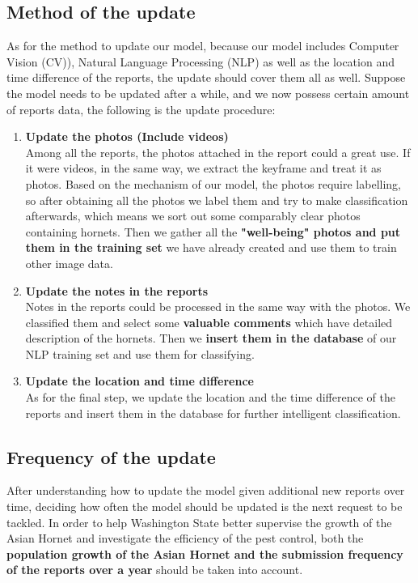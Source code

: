 \documentclass{mcmthesis}
\begin{document}
	\subsection{Method of the update}
	\quad As for the method to update our model, because our model includes Computer Vision (CV)), Natural Language Processing (NLP) as well as the location and time difference of the reports, the update should cover them all as well. Suppose the model needs to be updated after a while, and we now possess certain amount of reports data, the following is the update procedure:
	\begin{enumerate}
		\item \textbf{Update the photos (Include videos)}\\
		Among all the reports, the photos attached in the report could a great use. If it were videos, in the same way, we extract the keyframe and treat it as photos. Based on the mechanism of our model, the photos require labelling, so after obtaining all the photos we label them and try to make classification afterwards, which means we sort out some comparably clear photos containing hornets. Then we gather all the \textbf{"well-being" photos and put them in the training set} we have already created and use them to train other image data.
		\item \textbf{Update the notes in the reports}\\
		Notes in the reports could be processed in the same way with the photos. We classified them and select some \textbf{valuable comments} which have detailed description of the hornets. Then we \textbf{insert them in the database} of our NLP training set and use them for classifying. 
		\item \textbf{Update the location and time difference}\\
		As for the final step, we update the location and the time difference of the reports and insert them in the database for further intelligent classification.
	\end{enumerate}
	\subsection{Frequency of the update}
	\quad After understanding how to update the model given additional new reports over time, deciding how often the model should be updated is the next request to be tackled. In order to help Washington State better supervise the growth of the Asian Hornet and investigate the efficiency of the pest control, both the \textbf{population growth of the Asian Hornet and the submission frequency of the reports over a year} should be taken into account.
\end{document}
